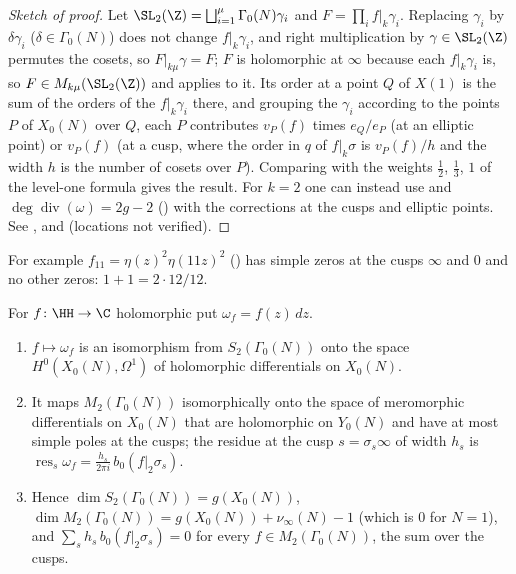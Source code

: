 \begin{proof}[Sketch of proof]
Let $\SL_2(\Z)=\bigsqcup_{i=1}^{\mu}\Gamma_0(N)\gamma_i$ and $F=\prod_if|_k\gamma_i$. Replacing $\gamma_i$ by $\delta\gamma_i$ ($\delta\in\Gamma_0(N)$) does not change $f|_k\gamma_i$, and right
multiplication by $\gamma\in\SL_2(\Z)$ permutes the cosets, so $F|_{k\mu}\gamma=F$; $F$ is holomorphic at $\infty$ because each $f|_k\gamma_i$ is, so $F\in M_{k\mu}(\SL_2(\Z))$ and
 applies to it. Its order at a point $Q$ of $X(1)$ is the sum of the orders of the $f|_k\gamma_i$ there, and grouping the $\gamma_i$ according to
the points $P$ of $X_0(N)$ over $Q$, each $P$ contributes $v_P(f)$ times $e_Q/e_P$ (at an elliptic point) or $v_P(f)$ (at a cusp, where the order in $q$ of $f|_k\sigma$ is $v_P(f)/h$
and the width $h$ is the number of cosets over $P$). Comparing with the weights $\frac12$, $\frac13$, $1$ of the level-one formula gives the result. For $k=2$ one can instead use
 and $\deg\operatorname{div}(\omega)=2g-2$ () with the corrections at the cusps and elliptic points.
See \cite[Chapter 3, exercises of Section 3.1]{DiamondShurman}, \cite[Section 2.4]{Shimura71} and \cite[Chapter 9]{Stein} (locations not verified).
\end{proof}

For example $f_{11}=\eta(z)^2\eta(11z)^2$ () has simple zeros at the cusps $\infty$ and $0$ and no other zeros: $1+1=2\cdot12/12$.

\begin{theorem}\label{thm:modforms:weight-two-differentials}
For $f\colon\HH\to\C$ holomorphic put $\omega_f=f(z)\,dz$.
\begin{enumerate}[label=(\roman*)]
\item $f\mapsto\omega_f$ is an isomorphism from $S_2(\Gamma_0(N))$ onto the space $H^0(X_0(N),\Omega^1)$ of holomorphic differentials on $X_0(N)$.
\item It maps $M_2(\Gamma_0(N))$ isomorphically onto the space of meromorphic differentials on $X_0(N)$ that are holomorphic on $Y_0(N)$ and have at most simple poles at the
cusps; the residue at the cusp $s=\sigma_s\infty$ of width $h_s$ is $\operatorname{res}_s\omega_f=\frac{h_s}{2\pi i}\,b_0(f|_2\sigma_s)$.
\item Hence $\dim S_2(\Gamma_0(N))=g(X_0(N))$, $\dim M_2(\Gamma_0(N))=g(X_0(N))+\nu_\infty(N)-1$ (which is $0$ for $N=1$), and
$\sum_sh_s\,b_0(f|_2\sigma_s)=0$ for every $f\in M_2(\Gamma_0(N))$, the sum over the cusps.
\end{enumerate}
\end{theorem}

